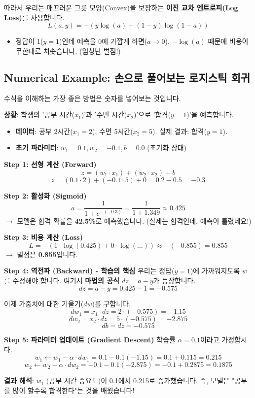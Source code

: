 \documentclass[11pt,a4paper]{book}
\theoremstyle{definition}
\begin{document}
따라서 우리는 매끄러운 그릇 모양(Convex)을 보장하는 \textbf{이진 교차 엔트로피(Log Loss)}를 사용합니다.
$$L(a, y) = -(y \log(a) + (1-y) \log(1-a))$$
\begin{itemize}
    \item 정답이 1($y=1$)인데 예측을 0에 가깝게 하면($a \to 0$), $-\log(a)$ 때문에 비용이 무한대로 치솟습니다. (엄청난 벌점!)
\end{itemize}

\subsection{Numerical Example: 손으로 풀어보는 로지스틱 회귀}

수식을 이해하는 가장 좋은 방법은 숫자를 넣어보는 것입니다.

\begin{examplebox}[title={시험 합격 예측 시나리오}]
\textbf{상황}: 학생의 '공부 시간($x_1$)'과 '수면 시간($x_2$)'으로 '합격($y=1$)'을 예측합니다.
\begin{itemize}
    \item \textbf{데이터}: 공부 2시간($x_1=2$), 수면 5시간($x_2=5$). 실제 결과: 합격($y=1$).
    \item \textbf{초기 파라미터}: $w_1=0.1, w_2=-0.1, b=0.0$ (초기화 상태)
\end{itemize}

\textbf{Step 1: 선형 계산 (Forward)}
$$z = (w_1 \cdot x_1) + (w_2 \cdot x_2) + b$$
$$z = (0.1 \cdot 2) + (-0.1 \cdot 5) + 0 = 0.2 - 0.5 = -0.3$$

\textbf{Step 2: 활성화 (Sigmoid)}
$$a = \frac{1}{1 + e^{-(-0.3)}} = \frac{1}{1 + 1.349} \approx 0.425$$
$\rightarrow$ 모델은 합격 확률을 \textbf{42.5\%}로 예측했습니다. (실제는 합격인데, 예측이 틀렸네요!)

\textbf{Step 3: 비용 계산 (Loss)}
$$L = -(1 \cdot \log(0.425) + 0 \cdot \log(\dots)) \approx -(-0.855) = 0.855$$
$\rightarrow$ 벌점은 \textbf{0.855}입니다.

\textbf{Step 4: 역전파 (Backward) - 학습의 핵심}
우리는 정답($y=1$)에 가까워지도록 $w$를 수정해야 합니다. 여기서 \textbf{마법의 공식} $dz = a - y$가 등장합니다.
$$dz = a - y = 0.425 - 1 = -0.575$$

이제 가중치에 대한 기울기($dw$)를 구합니다.
$$dw_1 = x_1 \cdot dz = 2 \cdot (-0.575) = -1.15$$
$$dw_2 = x_2 \cdot dz = 5 \cdot (-0.575) = -2.875$$
$$db = dz = -0.575$$

\textbf{Step 5: 파라미터 업데이트 (Gradient Descent)}
학습률 $\alpha = 0.1$이라고 가정합시다.
$$w_1 \leftarrow w_1 - \alpha \cdot dw_1 = 0.1 - 0.1(-1.15) = 0.1 + 0.115 = 0.215$$
$$w_2 \leftarrow w_2 - \alpha \cdot dw_2 = -0.1 - 0.1(-2.875) = -0.1 + 0.2875 = 0.1875$$

\textbf{결과 해석}:
$w_1$ (공부 시간 중요도)이 0.1에서 0.215로 증가했습니다. 즉, 모델은 "공부를 많이 할수록 합격한다"는 것을 배웠습니다!
\end{examplebox}
\end{document}
